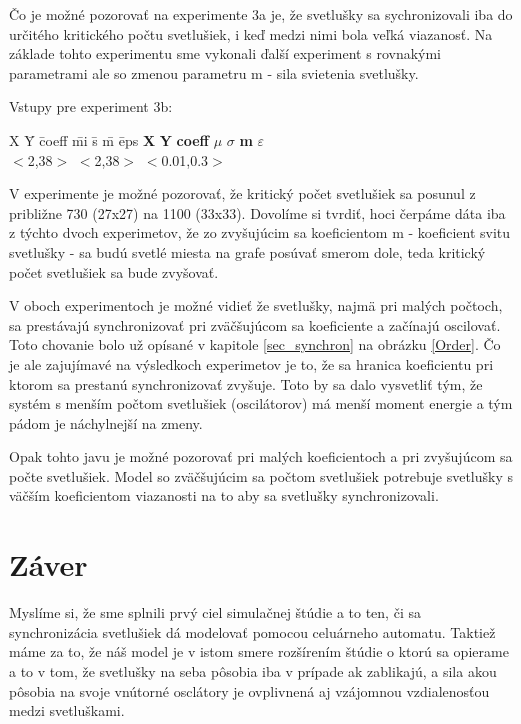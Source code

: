\documentclass[a4paper, 11pt]{article}
\begin{document}
Čo je možné pozorovať na experimente 3a je, že svetlušky sa sychronizovali iba do určitého kritického počtu svetlušiek, i keď medzi nimi bola veľká viazanosť. Na základe tohto experimentu sme vykonali ďalší experiment s rovnakými parametrami ale so zmenou parametru m - sila svietenia svetlušky.

\noindent Vstupy pre experiment 3b:
\begin{tabbing}
    X \quad \quad \quad \quad\= Y \quad \quad \quad \quad\= coeff \quad  \quad \quad \quad\= mi \quad  \= s \quad  \quad \= m \quad \= eps \kill %
    \textbf{X} \> \textbf{Y} \> \textbf{coeff} \> \textbf{$\mu$} \> \textbf{$\sigma$} \> \textbf{m} \> \textbf{$\varepsilon$}\\ 
    $<$2,38$>$          \> $<$2,38$>$    \> $<$0.01,0.3$>$                     
\end{tabbing}


V experimente je možné pozorovať, že kritický počet svetlušiek sa posunul z približne 730 (27x27) na 1100 (33x33). Dovolíme si tvrdiť, hoci čerpáme dáta iba z týchto dvoch experimetov, že zo zvyšujúcim sa koeficientom m - koeficient svitu svetlušky - sa budú svetlé miesta na grafe posúvať smerom dole, teda kritický počet svetlušiek sa bude zvyšovať. 

V oboch experimentoch je možné vidieť že svetlušky, najmä pri malých počtoch, sa prestávajú synchronizovať pri zväčšujúcom sa koeficiente a začínajú oscilovať. Toto chovanie bolo už opísané v kapitole \ref{sec_synchron} na obrázku \ref{Order}. Čo je ale zajujímavé na výsledkoch experimetov je to, že sa hranica koeficientu pri ktorom sa prestanú synchronizovať zvyšuje. Toto by sa dalo vysvetliť tým, že systém s menším počtom svetlušiek (oscilátorov) má menší moment energie a tým pádom je náchylnejší na zmeny.

Opak tohto javu je možné pozorovať pri malých koeficientoch a pri zvyšujúcom sa počte svetlušiek. Model so zväčšujúcim sa počtom svetlušiek potrebuje svetlušky s väčším koeficientom viazanosti na to aby sa svetlušky synchronizovali.






\pagebreak 
\section{Záver}
Myslíme si, že sme splnili prvý ciel simulačnej štúdie a to ten, či sa synchronizácia svetlušiek dá modelovať pomocou celuárneho automatu. Taktiež máme za to, že náš model je v istom smere rozšírením štúdie o ktorú sa opierame a to v tom, že svetlušky na seba pôsobia iba v prípade ak zablikajú, a sila akou pôsobia na svoje vnútorné osclátory je ovplivnená aj vzájomnou vzdialenosťou medzi svetluškami.
\end{document}
